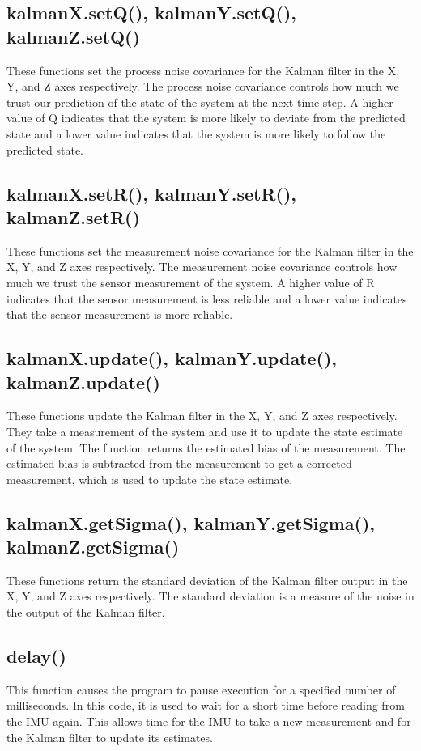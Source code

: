 \subsection{kalmanX.setQ(), kalmanY.setQ(), kalmanZ.setQ()}
These functions set the process noise covariance for the Kalman filter in the X, Y, and Z axes respectively. The process noise covariance controls how much we trust our prediction of the state of the system at the next time step. A higher value of Q indicates that the system is more likely to deviate from the predicted state and a lower value indicates that the system is more likely to follow the predicted state.

\subsection{kalmanX.setR(), kalmanY.setR(), kalmanZ.setR() }
These functions set the measurement noise covariance for the Kalman filter in the X, Y, and Z axes respectively. The measurement noise covariance controls how much we trust the sensor measurement of the system. A higher value of R indicates that the sensor measurement is less reliable and a lower value indicates that the sensor measurement is more reliable.

\subsection{kalmanX.update(), kalmanY.update(), kalmanZ.update() }
These functions update the Kalman filter in the X, Y, and Z axes respectively. They take a measurement of the system and use it to update the state estimate of the system. The function returns the estimated bias of the measurement. The estimated bias is subtracted from the measurement to get a corrected measurement, which is used to update the state estimate.

\subsection{kalmanX.getSigma(), kalmanY.getSigma(), kalmanZ.getSigma() }
These functions return the standard deviation of the Kalman filter output in the X, Y, and Z axes respectively. The standard deviation is a measure of the noise in the output of the Kalman filter.

\subsection{delay() }
This function causes the program to pause execution for a specified number of milliseconds. In this code, it is used to wait for a short time before reading from the IMU again. This allows time for the IMU to take a new measurement and for the Kalman filter to update its estimates.

